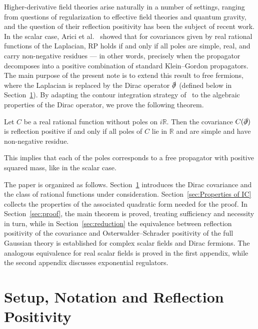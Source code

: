\documentclass[10pt,a4paper,oneside,reqno]{amsart}
\begin{document}
Higher-derivative field theories arise naturally in a number of settings, ranging from questions of regularization to effective field theories and quantum gravity, and the question of their reflection positivity has been the subject of recent work. 
In the scalar case, Arici et al.~\cite{Saueressig2018_RP} showed that for covariances given by real rational functions of the Laplacian, RP holds if and only if all poles are simple, real, and carry non-negative residues --- in other words, precisely when the propagator decomposes into a positive combination of standard Klein--Gordon propagators. The main purpose of the present note is to extend this result to free fermions, where the Laplacian is replaced by the Dirac operator $\slashed{\partial}$ (defined below in Section~\ref{sec:dirac}). By adapting the contour integration strategy of~\cite{Saueressig2018_RP} to the algebraic properties of the Dirac operator, we prove the following theorem. 

\begin{theorem}\label{thm:main}
Let $C$ be a real rational function without poles on $i\mathbb{R}$. Then the covariance $C(\slashed{\partial})$ is reflection positive if and only if all poles of $C$ lie in $\mathbb{R}$ and are simple and have non-negative residue.
\end{theorem}

\begin{remark}
This implies that each of the poles corresponds to
a free propagator with positive squared mass, like in the scalar case. 
\end{remark}

The paper is organized as follows. Section~\ref{sec:dirac} introduces the Dirac covariance and the class of rational functions under consideration. Section~\ref{sec:Properties of IC} collects the properties of the associated quadratic form needed for the proof. In Section~\ref{sec:proof}, the main theorem is proved, treating sufficiency and necessity in turn, while in Section~\ref{sec:reduction} the equivalence between reflection positivity of the covariance and Osterwalder--Schrader positivity of the full Gaussian theory is established for complex scalar fields and Dirac fermions. The analogous equivalence for real scalar fields is proved in the first appendix, while the second appendix discusses exponential regulators.

\section{Setup, Notation and Reflection Positivity}\label{sec:dirac}
\end{document}
